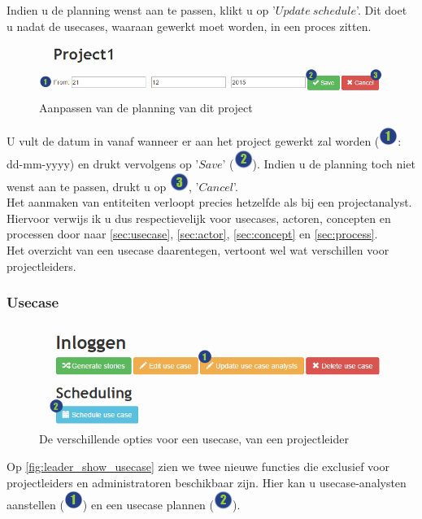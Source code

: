 \documentclass[a4paper,11pt]{article}
\newcommand{\one}{\includegraphics[scale=0.5]{Gebruikershandleiding_img/1.png}}
\newcommand{\two}{\includegraphics[scale=0.5]{Gebruikershandleiding_img/2.png}}
\newcommand{\three}{\includegraphics[scale=0.5]{Gebruikershandleiding_img/3.png}}
\begin{document}
Indien u de planning wenst aan te passen, klikt u op '$Update\ schedule$'. Dit doet u nadat de usecases, waaraan gewerkt moet worden, in een proces zitten.
\begin{figure}[H]
\centering
\includegraphics[scale=0.5]{Gebruikershandleiding_img/updateschedule.png}
\caption{Aanpassen van de planning van dit project}
\label{fig:updateschedule}
\end{figure}

U vult de datum in vanaf wanneer er aan het project gewerkt zal worden (\one: dd-mm-yyyy) en drukt vervolgens op '$Save$' (\two). Indien u de planning toch niet wenst aan te passen, drukt u op \three, '$Cancel$'.\\

Het aanmaken van entiteiten verloopt precies hetzelfde als bij een projectanalyst. Hiervoor verwijs ik u dus respectievelijk voor usecases, actoren, concepten en processen door naar \autoref{sec:usecase}, \ref{sec:actor}, \ref{sec:concept} en \ref{sec:process}.\\
Het overzicht van een usecase daarentegen, vertoont wel wat verschillen voor projectleiders.

\subsubsection{Usecase}
\begin{figure}[H]
\centering
\includegraphics[scale=0.5]{Gebruikershandleiding_img/leader_show_usecase.png}
\caption{De verschillende opties voor een usecase, van een projectleider}
\label{fig:leader_show_usecase}
\end{figure}

Op \autoref{fig:leader_show_usecase} zien we twee nieuwe functies die exclusief voor projectleiders en administratoren beschikbaar zijn. Hier kan u usecase-analysten aanstellen (\one) en een usecase plannen (\two).\\
\end{document}
